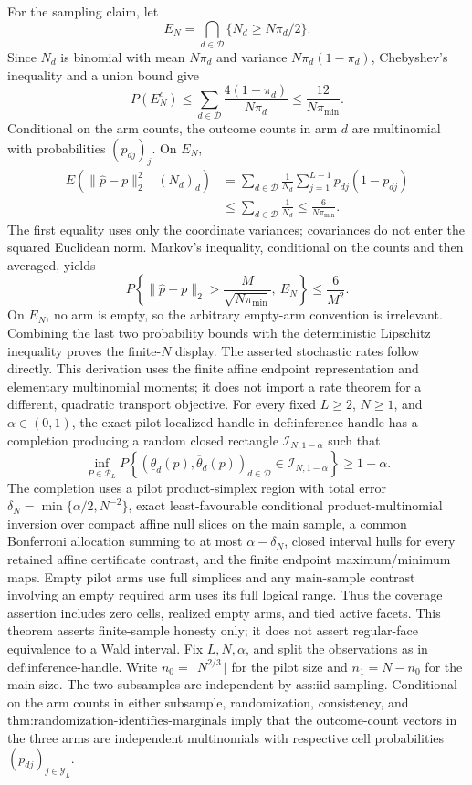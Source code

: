 For the sampling claim, let
\[
 E_N=\bigcap_{d\in\mathcal D}\{N_d\ge N\pi_d/2\}.
\]
Since \(N_d\) is binomial with mean \(N\pi_d\) and variance \(N\pi_d(1-\pi_d)\), Chebyshev's inequality and a union bound give
\[
 P(E_N^c)\le\sum_{d\in\mathcal D}\frac{4(1-\pi_d)}{N\pi_d}
 \le\frac{12}{N\pi_{\min}}.
\]
Conditional on the arm counts, the outcome counts in arm \(d\) are multinomial with probabilities \((p_{dj})_j\).  On \(E_N\),
\[
\begin{aligned}
 E\left(\|\widehat p-p\|_2^2\mid(N_d)_d\right)
 &=\sum_{d\in\mathcal D}\frac1{N_d}
   \sum_{j=1}^{L-1}p_{dj}(1-p_{dj})\\
 &\le\sum_{d\in\mathcal D}\frac1{N_d}
 \le\frac6{N\pi_{\min}}.
\end{aligned}
\]
The first equality uses only the coordinate variances; covariances do not enter the squared Euclidean norm.  Markov's inequality, conditional on the counts and then averaged, yields
\[
 P\left\{\|\widehat p-p\|_2>\frac{M}{\sqrt{N\pi_{\min}}},\ E_N\right\}\le\frac6{M^2}.
\]
On \(E_N\), no arm is empty, so the arbitrary empty-arm convention is irrelevant.  Combining the last two probability bounds with the deterministic Lipschitz inequality proves the finite-\(N\) display.  The asserted stochastic rates follow directly.  This derivation uses the finite affine endpoint representation and elementary multinomial moments; it does not import a rate theorem for a different, quadratic transport objective.
For every fixed \(L\ge2\), \(N\ge1\), and \(\alpha\in(0,1)\), the exact pilot-localized handle in \(\text{def:inference-handle}\) has a completion producing a random closed rectangle \(\mathcal I_{N,1-\alpha}\) such that
\[
 \inf_{P\in\mathcal P_L}P\left\{
 (\underline\theta_d(p),\overline\theta_d(p))_{d\in\mathcal D}
 \in\mathcal I_{N,1-\alpha}\right\}\ge1-\alpha.
\]
The completion uses a pilot product-simplex region with total error \(\delta_N=\min\{\alpha/2,N^{-2}\}\), exact least-favourable conditional product-multinomial inversion over compact affine null slices on the main sample, a common Bonferroni allocation summing to at most \(\alpha-\delta_N\), closed interval hulls for every retained affine certificate contrast, and the finite endpoint maximum/minimum maps.  Empty pilot arms use full simplices and any main-sample contrast involving an empty required arm uses its full logical range.  Thus the coverage assertion includes zero cells, realized empty arms, and tied active facets.  This theorem asserts finite-sample honesty only; it does not assert regular-face equivalence to a Wald interval.
Fix \(L,N,\alpha\), and split the observations as in \(\text{def:inference-handle}\).  Write \(n_0=\lfloor N^{2/3}\rfloor\) for the pilot size and \(n_1=N-n_0\) for the main size.  The two subsamples are independent by \(\text{ass:iid-sampling}\).  Conditional on the arm counts in either subsample, randomization, consistency, and \(\text{thm:randomization-identifies-marginals}\) imply that the outcome-count vectors in the three arms are independent multinomials with respective cell probabilities \((p_{dj})_{j\in\mathcal Y_L}\).

